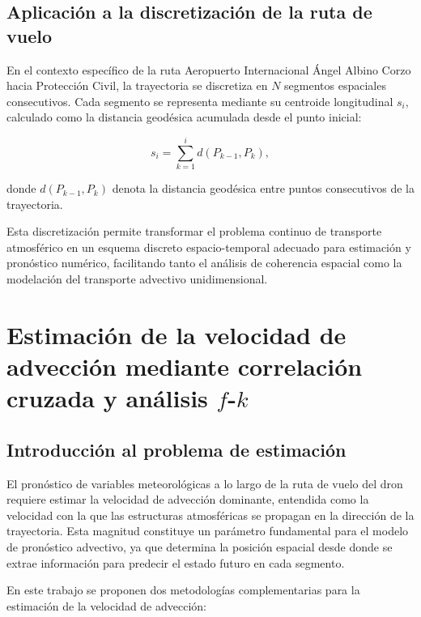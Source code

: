 \documentclass[
  spanish,
  us-letterpaper,
]{scrreprt}
\numberwithin{equation}{section}
\begin{document}
\subsection{Aplicación a la discretización de la ruta de
vuelo}\label{aplicaciuxf3n-a-la-discretizaciuxf3n-de-la-ruta-de-vuelo}

En el contexto específico de la ruta Aeropuerto Internacional Ángel
Albino Corzo hacia Protección Civil, la trayectoria se discretiza en
\(N\) segmentos espaciales consecutivos. Cada segmento se representa
mediante su centroide longitudinal \(s_i\), calculado como la distancia
geodésica acumulada desde el punto inicial:

\[
s_i = \sum_{k=1}^{i} d(P_{k-1}, P_k),
\]

donde \(d(P_{k-1}, P_k)\) denota la distancia geodésica entre puntos
consecutivos de la trayectoria.

Esta discretización permite transformar el problema continuo de
transporte atmosférico en un esquema discreto espacio-temporal adecuado
para estimación y pronóstico numérico, facilitando tanto el análisis de
coherencia espacial como la modelación del transporte advectivo
unidimensional.

\section{\texorpdfstring{Estimación de la velocidad de advección
mediante correlación cruzada y análisis
\(f\)-\(k\)}{Estimación de la velocidad de advección mediante correlación cruzada y análisis f-k}}\label{sec-analisisadveccion}

\subsection{Introducción al problema de
estimación}\label{introducciuxf3n-al-problema-de-estimaciuxf3n}

El pronóstico de variables meteorológicas a lo largo de la ruta de vuelo
del dron requiere estimar la velocidad de advección dominante, entendida
como la velocidad con la que las estructuras atmosféricas se propagan en
la dirección de la trayectoria. Esta magnitud constituye un parámetro
fundamental para el modelo de pronóstico advectivo, ya que determina la
posición espacial desde donde se extrae información para predecir el
estado futuro en cada segmento.

En este trabajo se proponen dos metodologías complementarias para la
estimación de la velocidad de advección:
\end{document}
